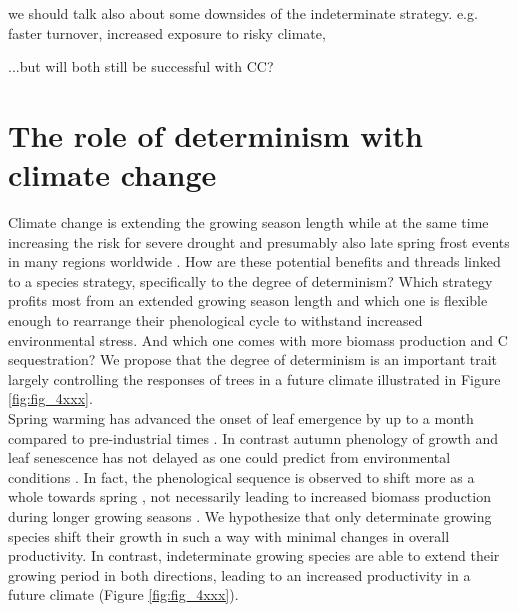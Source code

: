 \documentclass{article}
\begin{document}
	we should talk also about some downsides of the indeterminate strategy. e.g. faster turnover, increased exposure to risky climate, 
	
	...but will both still be successful with CC?
	
\section*{The role of determinism with climate change}
Climate change is extending the growing season length while at the same time increasing the risk for severe drought \citep{haoChangesSeverityCompound2018} and presumably also late spring frost events in many regions worldwide \citep{zohnerLatespringFrostRisk2020}. How are these potential benefits and threads linked to a species strategy, specifically to the degree of determinism? Which strategy profits most from an extended growing season length and which one is flexible enough to rearrange their phenological cycle to withstand increased environmental stress. And which one comes with more biomass production and C sequestration? We propose that the degree of determinism is an important trait largely controlling the responses of trees in a future climate illustrated in Figure \ref{fig:fig_4xxx}. \\

Spring warming has advanced the onset of leaf emergence by up to a month compared to pre-industrial times \citep{vitasseGreatAccelerationPlant2022b}. In contrast autumn phenology of growth and leaf senescence has not delayed as one could predict from environmental conditions \cite{zaniIncreasedGrowingseasonProductivity2020b, zohnerEffectClimateWarming2023}. In fact, the phenological sequence is observed to shift more as a whole towards spring \cite{keenanTimingAutumnSenescence2015b}, not necessarily leading to increased biomass production during longer growing seasons \citep{zaniIncreasedGrowingseasonProductivity2020b}. We hypothesize that only determinate growing species shift their growth in such a way with minimal changes in overall productivity. In contrast, indeterminate growing species are able to extend their growing period in both directions, leading to an increased productivity in a future climate (Figure \ref{fig:fig_4xxx}). \\
\end{document}
